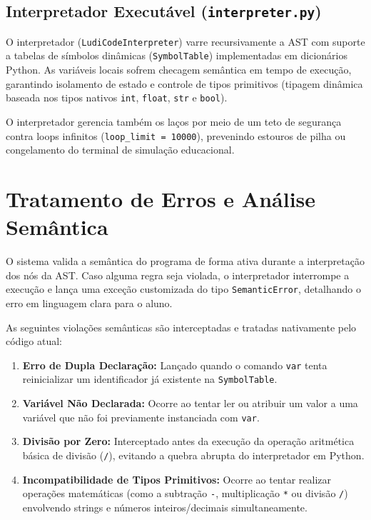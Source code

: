\documentclass[12pt,a4paper]{article}
\begin{document}
\subsection{Interpretador Executável (\texttt{interpreter.py})}

O interpretador (\texttt{LudiCodeInterpreter}) varre recursivamente a AST com suporte a tabelas de símbolos dinâmicas (\texttt{SymbolTable}) implementadas em dicionários Python. As variáveis locais sofrem checagem semântica em tempo de execução, garantindo isolamento de estado e controle de tipos primitivos (tipagem dinâmica baseada nos tipos nativos \texttt{int}, \texttt{float}, \texttt{str} e \texttt{bool}).

O interpretador gerencia também os laços por meio de um teto de segurança contra loops infinitos (\texttt{loop\_limit = 10000}), prevenindo estouros de pilha ou congelamento do terminal de simulação educacional.

\section{Tratamento de Erros e Análise Semântica}

O sistema valida a semântica do programa de forma ativa durante a interpretação dos nós da AST. Caso alguma regra seja violada, o interpretador interrompe a execução e lança uma exceção customizada do tipo \texttt{SemanticError}, detalhando o erro em linguagem clara para o aluno.

As seguintes violações semânticas são interceptadas e tratadas nativamente pelo código atual:

\begin{enumerate}
    \item \textbf{Erro de Dupla Declaração:} Lançado quando o comando \texttt{var} tenta reinicializar um identificador já existente na \texttt{SymbolTable}.
    \item \textbf{Variável Não Declarada:} Ocorre ao tentar ler ou atribuir um valor a uma variável que não foi previamente instanciada com \texttt{var}.
    \item \textbf{Divisão por Zero:} Interceptado antes da execução da operação aritmética básica de divisão (\texttt{/}), evitando a quebra abrupta do interpretador em Python.
    \item \textbf{Incompatibilidade de Tipos Primitivos:} Ocorre ao tentar realizar operações matemáticas (como a subtração \texttt{-}, multiplicação \texttt{*} ou divisão \texttt{/}) envolvendo strings e números inteiros/decimais simultaneamente.
\end{enumerate}
\end{document}
